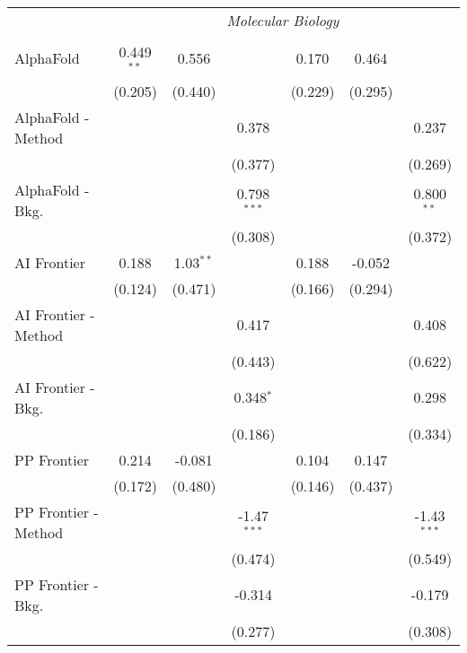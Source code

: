 \begin{tabular}{lcccccc}
 & \multicolumn{6}{c}{\textit{Molecular Biology}} \\ \\
   AlphaFold            & 0.449$^{**}$ & 0.556       &               & 0.170   & 0.464   &   \\   
                        & (0.205)      & (0.440)     &               & (0.229) & (0.295) &   \\   
   AlphaFold - Method   &              &             & 0.378         &         &         & 0.237\\   
                        &              &             & (0.377)       &         &         & (0.269)\\   
   AlphaFold - Bkg.     &              &             & 0.798$^{***}$ &         &         & 0.800$^{**}$\\   
                        &              &             & (0.308)       &         &         & (0.372)\\   
   AI Frontier          & 0.188        & 1.03$^{**}$ &               & 0.188   & -0.052  &   \\   
                        & (0.124)      & (0.471)     &               & (0.166) & (0.294) &   \\   
   AI Frontier - Method &              &             & 0.417         &         &         & 0.408\\   
                        &              &             & (0.443)       &         &         & (0.622)\\   
   AI Frontier - Bkg.   &              &             & 0.348$^{*}$   &         &         & 0.298\\   
                        &              &             & (0.186)       &         &         & (0.334)\\   
   PP Frontier          & 0.214        & -0.081      &               & 0.104   & 0.147   &   \\   
                        & (0.172)      & (0.480)     &               & (0.146) & (0.437) &   \\   
   PP Frontier - Method &              &             & -1.47$^{***}$ &         &         & -1.43$^{***}$\\   
                        &              &             & (0.474)       &         &         & (0.549)\\   
   PP Frontier - Bkg.   &              &             & -0.314        &         &         & -0.179\\   
                        &              &             & (0.277)       &         &         & (0.308)\\   

\end{tabular}
